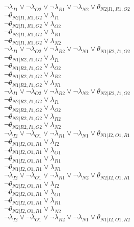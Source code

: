 $\neg\lambda_{I1} \vee \neg\lambda_{O2} \vee \neg\lambda_{R1} \vee \neg\lambda_{N2} \vee \theta_{N2|I1,R1,O2}$\\
$\neg\theta_{N2|I1,R1,O2} \vee \lambda_{I1}$\\
$\neg\theta_{N2|I1,R1,O2} \vee \lambda_{O2}$\\
$\neg\theta_{N2|I1,R1,O2} \vee \lambda_{R1}$\\
$\neg\theta_{N2|I1,R1,O2} \vee \lambda_{N2}$\\
$\neg\lambda_{I1} \vee \neg\lambda_{O2} \vee \neg\lambda_{R2} \vee \neg\lambda_{N1} \vee \theta_{N1|R2,I1,O2}$\\
$\neg\theta_{N1|R2,I1,O2} \vee \lambda_{I1}$\\
$\neg\theta_{N1|R2,I1,O2} \vee \lambda_{O2}$\\
$\neg\theta_{N1|R2,I1,O2} \vee \lambda_{R2}$\\
$\neg\theta_{N1|R2,I1,O2} \vee \lambda_{N1}$\\
$\neg\lambda_{I1} \vee \neg\lambda_{O2} \vee \neg\lambda_{R2} \vee \neg\lambda_{N2} \vee \theta_{N2|R2,I1,O2}$\\
$\neg\theta_{N2|R2,I1,O2} \vee \lambda_{I1}$\\
$\neg\theta_{N2|R2,I1,O2} \vee \lambda_{O2}$\\
$\neg\theta_{N2|R2,I1,O2} \vee \lambda_{R2}$\\
$\neg\theta_{N2|R2,I1,O2} \vee \lambda_{N2}$\\
$\neg\lambda_{I2} \vee \neg\lambda_{O1} \vee \neg\lambda_{R1} \vee \neg\lambda_{N1} \vee \theta_{N1|I2,O1,R1}$\\
$\neg\theta_{N1|I2,O1,R1} \vee \lambda_{I2}$\\
$\neg\theta_{N1|I2,O1,R1} \vee \lambda_{O1}$\\
$\neg\theta_{N1|I2,O1,R1} \vee \lambda_{R1}$\\
$\neg\theta_{N1|I2,O1,R1} \vee \lambda_{N1}$\\
$\neg\lambda_{I2} \vee \neg\lambda_{O1} \vee \neg\lambda_{R1} \vee \neg\lambda_{N2} \vee \theta_{N2|I2,O1,R1}$\\
$\neg\theta_{N2|I2,O1,R1} \vee \lambda_{I2}$\\
$\neg\theta_{N2|I2,O1,R1} \vee \lambda_{O1}$\\
$\neg\theta_{N2|I2,O1,R1} \vee \lambda_{R1}$\\
$\neg\theta_{N2|I2,O1,R1} \vee \lambda_{N2}$\\
$\neg\lambda_{I2} \vee \neg\lambda_{O1} \vee \neg\lambda_{R2} \vee \neg\lambda_{N1} \vee \theta_{N1|I2,O1,R2}$\\
